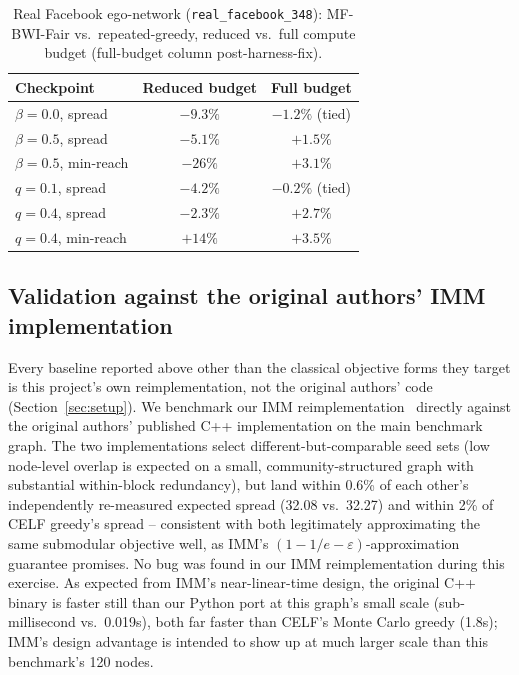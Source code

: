 \documentclass[journal]{IEEEtran}
\begin{document}
\begin{table}[t]
\centering
\caption{Real Facebook ego-network (\texttt{real\_facebook\_348}):
MF-BWI-Fair vs.\ repeated-greedy, reduced vs.\ full compute budget
(full-budget column post-harness-fix).}
\label{tab:realgraph}
\begin{tabular}{lcc}
\toprule
Checkpoint & Reduced budget & Full budget \\
\midrule
$\beta=0.0$, spread    & $-9.3\%$ & $-1.2\%$ (tied) \\
$\beta=0.5$, spread    & $-5.1\%$ & $\mathbf{+1.5\%}$ \\
$\beta=0.5$, min-reach & $-26\%$  & $\mathbf{+3.1\%}$ \\
$q=0.1$, spread        & $-4.2\%$ & $-0.2\%$ (tied) \\
$q=0.4$, spread        & $-2.3\%$ & $\mathbf{+2.7\%}$ \\
$q=0.4$, min-reach     & $+14\%$  & $\mathbf{+3.5\%}$ \\
\bottomrule
\end{tabular}
\end{table}

\subsection{Validation against the original authors' IMM implementation}
\label{sec:results-imm}

Every baseline reported above other than the classical objective forms
they target is this project's own reimplementation, not the original
authors' code (Section~\ref{sec:setup}). We benchmark our IMM
reimplementation~\cite{tang2015influence} directly against the original
authors' published C++ implementation on the main benchmark graph. The
two implementations select different-but-comparable seed sets (low
node-level overlap is expected on a small, community-structured graph
with substantial within-block redundancy), but land within 0.6\% of each
other's independently re-measured expected spread (32.08 vs.\ 32.27) and
within 2\% of CELF greedy's spread -- consistent with both legitimately
approximating the same submodular objective well, as IMM's
$(1-1/e-\varepsilon)$-approximation guarantee promises. No bug was found
in our IMM reimplementation during this exercise. As expected from IMM's
near-linear-time design, the original C++ binary is faster still than
our Python port at this graph's small scale (sub-millisecond vs.\ 0.019s),
both far faster than CELF's Monte Carlo greedy (1.8s); IMM's design
advantage is intended to show up at much larger scale than this
benchmark's 120 nodes.
\end{document}
